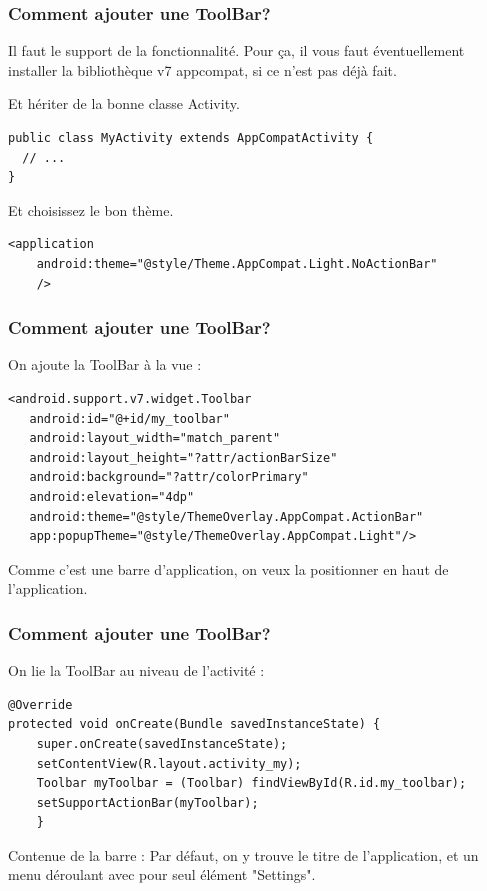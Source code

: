 \documentclass{beamer}
\begin{document}
\begin{frame}[fragile]
\frametitle{Comment ajouter une ToolBar?}

\begin{block}{Il faut le support de la fonctionnalité.}
Pour ça, il vous faut éventuellement installer la bibliothèque v7 appcompat, si ce n'est pas déjà fait.
\end{block}

\begin{block}{Et hériter de la bonne classe Activity.}
\begin{lstlisting}
public class MyActivity extends AppCompatActivity {
  // ...
}
\end{lstlisting}
\pause
\begin{block}{Et choisissez le bon thème.}
\lstset{language=xml}
\begin{lstlisting}
<application
    android:theme="@style/Theme.AppCompat.Light.NoActionBar"
    />
\end{lstlisting}
\lstset{language=java}
\end{block}
\end{block}
\end{frame}


\begin{frame}[fragile]
\frametitle{Comment ajouter une ToolBar?}

\begin{block}{On ajoute la ToolBar à la vue :}
\lstset{language=xml}
\begin{lstlisting}
<android.support.v7.widget.Toolbar
   android:id="@+id/my_toolbar"
   android:layout_width="match_parent"
   android:layout_height="?attr/actionBarSize"
   android:background="?attr/colorPrimary"
   android:elevation="4dp"
   android:theme="@style/ThemeOverlay.AppCompat.ActionBar"
   app:popupTheme="@style/ThemeOverlay.AppCompat.Light"/>
\end{lstlisting}
\lstset{language=java}
\end{block}
\begin{block}{}
Comme c'est une barre d'application, on veux la positionner en haut de l'application.
\end{block}
\end{frame}

\begin{frame}[fragile]
\frametitle{Comment ajouter une ToolBar?}

\begin{block}{On lie la ToolBar au niveau de l'activité :}
\lstset{language=java}
\begin{lstlisting}
@Override
protected void onCreate(Bundle savedInstanceState) {
    super.onCreate(savedInstanceState);
    setContentView(R.layout.activity_my);
    Toolbar myToolbar = (Toolbar) findViewById(R.id.my_toolbar);
    setSupportActionBar(myToolbar);
    }
\end{lstlisting}
\lstset{language=java}
\end{block}
\begin{exampleblock}{Contenue de la barre :}
Par défaut, on y trouve le titre de l'application, et un menu déroulant avec pour seul élément "Settings".
\end{exampleblock}
\end{frame}
\end{document}
